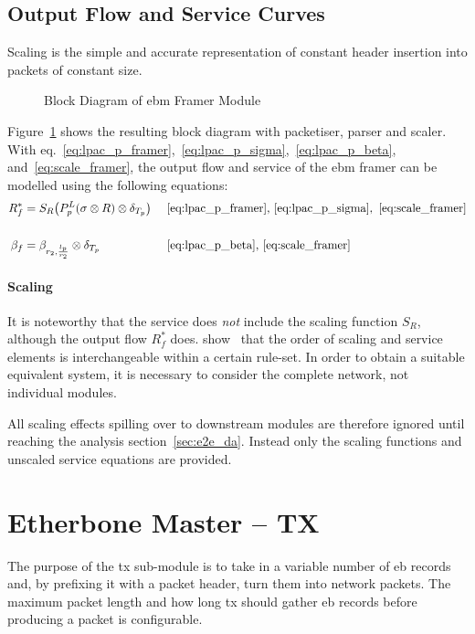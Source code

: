 \subsection{Output Flow and Service Curves}
Scaling is the simple and accurate representation of constant header insertion into packets of constant size.
\begin{figure}[H]
  \centering
  \def\svgwidth{0.6875\textwidth}
  
  \caption{Block Diagram of \gls{ebm} Framer Module}
  \label{fig:framer}
\end{figure}
\noindent
Figure~\ref{fig:framer} shows the resulting block diagram with packetiser, parser and scaler.
With eq.~\ref{eq:lpac_p_framer},~\ref{eq:lpac_p_sigma},~\ref{eq:lpac_p_beta}, and~\ref{eq:scale_framer}, the output flow and service of the \gls{ebm} framer can be modelled using the following equations:
%
\begin{align}
R^*_f &= S_R \big(P^L_p (\sigma \otimes R) \otimes \delta_{T_p} \big) &&\text{~\ref{eq:lpac_p_framer},~\ref{eq:lpac_p_sigma}},~\ref{eq:scale_framer} \label{eq:out_framer}\\
\notag\\
\beta_f &=  \beta_{r_2, \frac{l_p}{r_2}} \otimes \delta_{T_p} &&\text{~\ref{eq:lpac_p_beta},~\ref{eq:scale_framer}} \label{eq:beta_framer}
\end{align}
%
\paragraph{Scaling}
It is noteworthy that the service does \emph{not} include the scaling function $S_R$, although the output flow $R^*_f$ does.
\citeauthor{fidler_way_2006} show~\cite{fidler_way_2006} that the order of scaling and service elements is interchangeable within a certain rule-set.
In order to obtain a suitable equivalent system, it is necessary to consider the complete network, not individual modules.
\par
All scaling effects spilling over to downstream modules are therefore ignored until reaching the analysis section~\ref{sec:e2e_da}.
Instead only the scaling functions and unscaled service equations are provided.


\section{Etherbone Master -- TX}
\label{sec:ebm_tx}
The purpose of the \gls{tx} sub-module is to take in a variable number of \gls{eb} records and, by prefixing it with a packet header, turn them into network packets.
The maximum packet length and how long \gls{tx} should gather \gls{eb} records before producing a packet is configurable.

